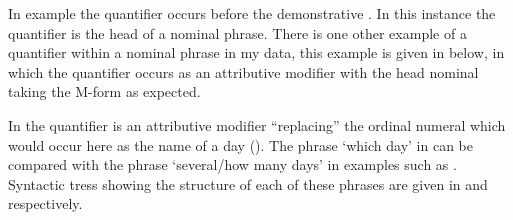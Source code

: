 In example  the quantifier  occurs
before the demonstrative .
In this instance the quantifier is the head of a nominal phrase.
There is one other example of a quantifier within a nominal phrase in my data,
this example is given in  below,
in which the quantifier occurs as an attributive modifier
with the head nominal taking the M-form as expected.

\begin{exe}
	\label{ex:130909-6, 1.26}
\end{exe}

In  the quantifier is an attributive modifier
``replacing'' the ordinal numeral which would occur here as the name of a day ().
The phrase  `which day' in 
can be compared with the phrase  `several/how many days'
in examples such as .
Syntactic tress showing the structure of each of these phrases
are given in  and  respectively.

\begin{multicols}{2}
	\begin{exe}
		\label{tr:NeanFauk}
	\end{exe}
	\begin{exe}
		\label{tr:NenoFauk}
	\end{exe}
\end{multicols}

